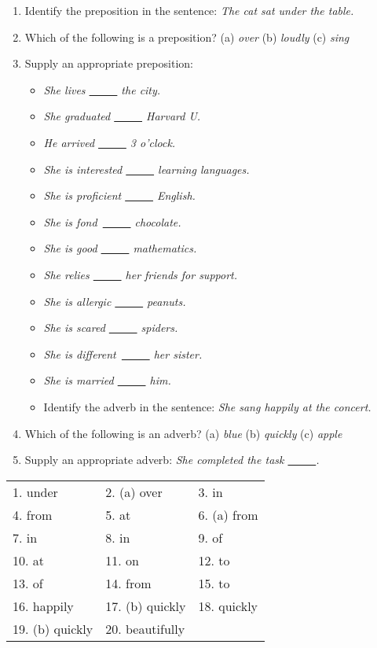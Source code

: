 \newpage

\begin{tcolorbox}[title=Self-check, colback=white]

\begin{enumerate}
    \item Identify the preposition in the sentence: \textit{The cat sat under the table.}
    \item Which of the following is a preposition? (a) \textit{over} (b) \textit{loudly} (c) \textit{sing}
    \item Supply an appropriate preposition: 
    \begin{itemize}
        \item \textit{She lives \uline{~~~~~} the city.}
    \item \textit{She graduated \uline{~~~~~} Harvard U.}
    \item \textit{He arrived \uline{~~~~~} 3 o'clock.}
    \item \textit{She is interested \uline{~~~~~} learning languages.}
    \item \textit{She is proficient \uline{~~~~~} English.}
    \item \textit{She is fond~\uline{~~~~~} chocolate.}
    \item \textit{She is good \uline{~~~~~} mathematics.}
    \item \textit{She relies \uline{~~~~~} her friends for support.}
    \item \textit{She is allergic \uline{~~~~~} peanuts.}
    \item \textit{She is scared \uline{~~~~~} spiders.}
    \item \textit{She is different~\uline{~~~~~} her sister.}
    \item \textit{She is married \uline{~~~~~} him.}
    \item Identify the adverb in the sentence: \textit{She sang happily at the concert.}
    \end{itemize}
    \item Which of the following is an adverb? (a) \textit{blue} (b) \textit{quickly} (c) \textit{apple}
    \item Supply an appropriate adverb: \textit{She completed the task \uline{~~~~~}.}
\end{enumerate}
\end{tcolorbox}

\begin{tcolorbox}[title=Answer key, colback=white]
    \begin{tabular}{lll}
1. under & 2. (a) over & 3. in \\
4. from & 5. at & 6. (a) from \\
7. in & 8. in & 9. of \\
10. at & 11. on & 12. to \\
13. of & 14. from & 15. to \\
16. happily & 17. (b) quickly & 18. quickly \\
19. (b) quickly & 20. beautifully & \\
\end{tabular}

\end{tcolorbox}